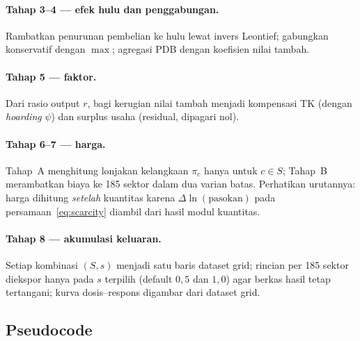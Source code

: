 \documentclass[11pt,a4paper]{article}
\newcommand{\en}[1]{\textit{#1}}   %
\begin{document}
\paragraph{Tahap 3--4 --- efek hulu dan penggabungan.} Rambatkan penurunan
pembelian ke hulu lewat invers Leontief; gabungkan konservatif dengan
$\max$; agregasi PDB dengan koefisien nilai tambah.

\paragraph{Tahap 5 --- faktor.} Dari rasio output $r$, bagi kerugian nilai
tambah menjadi kompensasi TK (dengan \en{hoarding} $\psi$) dan surplus
usaha (residual, dipagari nol).

\paragraph{Tahap 6--7 --- harga.} Tahap~A menghitung lonjakan kelangkaan
$\pi_c$ hanya untuk $c \in S$; Tahap~B merambatkan biaya ke 185 sektor
dalam dua varian batas. Perhatikan urutannya: harga dihitung \emph{setelah}
kuantitas karena $\Delta\ln(\text{pasokan})$ pada
persamaan~\eqref{eq:scarcity} diambil dari hasil modul kuantitas.

\paragraph{Tahap 8 --- akumulasi keluaran.} Setiap kombinasi $(S, s)$
menjadi satu baris dataset grid; rincian per 185 sektor diekspor hanya pada
$s$ terpilih (default $0{,}5$ dan $1{,}0$) agar berkas hasil tetap
tertangani; kurva dosis--respons digambar dari dataset grid.

\subsection{Pseudocode}
\end{document}
